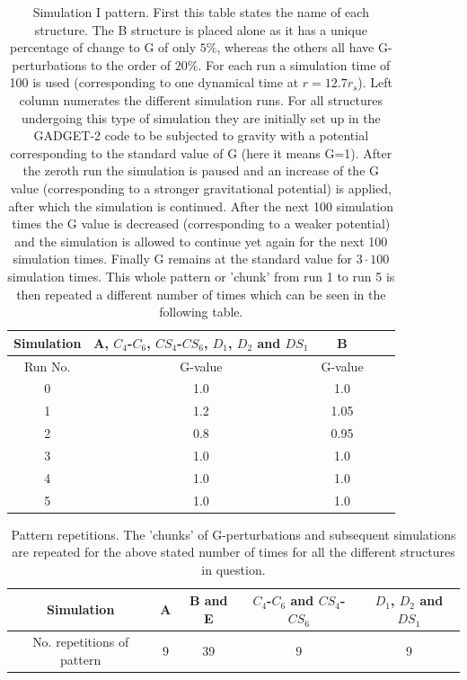 \begin{table}[!htbp]
\centering
\begin{tabular}{|c|c|c|c|c|}
\hline
 Simulation    & A, $C_4$-$C_6$, $CS_4$-$CS_6$, $D_1$, $D_2$ and $DS_1$ & B          \\ \hline
 Run No.       &   G-value                                              &   G-value  \\ \hline
 0			   &     1.0                 						       &     1.0    \\ \hline
 1			   &     1.2    											   &     1.05   \\ \hline
 2			   &     0.8     										   &     0.95   \\ \hline
 3			   &     1.0   											   &     1.0    \\ \hline
 4			   & 	 1.0     										   &     1.0    \\ \hline
 5			   & 	 1.0     									       &     1.0    \\ \hline
\end{tabular}
\caption {Simulation I pattern. First this table states the name of each structure. The B structure is placed alone as it has a unique percentage of change to G of only $5 \%$, whereas the others all have G-perturbations to the order of $20 \%$. For each run a simulation time of 100 is used (corresponding to one dynamical time at $r=12.7r_s$). Left column numerates the different simulation runs. For all structures undergoing this type of simulation they are initially set up in the GADGET-2 code to be subjected to gravity with a potential corresponding to the standard value of G (here it means G=1). After the zeroth run  the simulation is paused and an increase of the G value (corresponding to a stronger gravitational potential) is applied, after which the simulation is continued. After the next 100 simulation times the G value is decreased (corresponding to a weaker potential) and the simulation is allowed to continue yet again for the next 100 simulation times. Finally G remains at the standard value for $3\cdot 100$ simulation times. This whole pattern or 'chunk' from run 1 to run 5 is then repeated a different number of times which can be seen in the following table.
}
\end{table}

\begin{table}[!htbp]
\centering
\begin{tabular}{|c|c|c|c|c|}
\hline
 Simulation                   & A & B and E & $C_4$-$C_6$ and $CS_4$-$CS_6$ & $D_1$, $D_2$ and $DS_1$ \\ \hline
 No. repetitions of pattern   & 9 & 39& 9 & 9 \\ \hline
\end{tabular}
\caption {Pattern repetitions. The 'chunks' of G-perturbations and subsequent simulations are repeated for the above stated number of times for all the different structures in question.}
\end{table}

